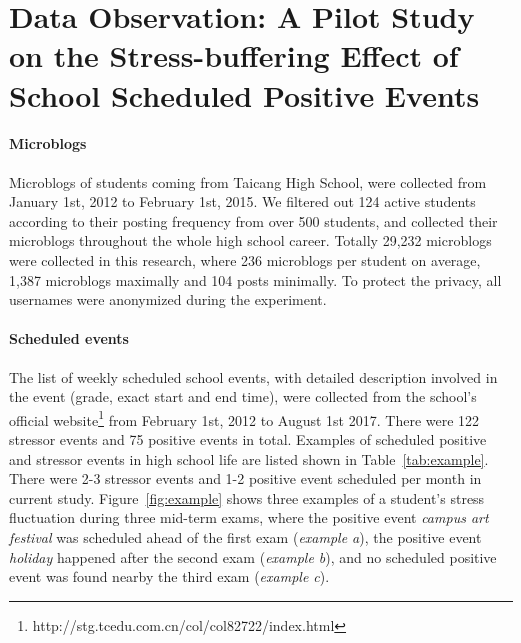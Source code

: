 \section{Data Observation: A Pilot Study on the Stress-buffering Effect of School Scheduled Positive Events}
\paragraph{Microblogs} Microblogs of students coming from Taicang High School,
were collected from January 1st, 2012 to February 1st, 2015. 
We filtered out 124 active students according to their posting frequency from over 500 students,
and collected their microblogs throughout the whole high school career.
Totally 29,232 microblogs were collected in this research,
where 236 microblogs per student on average, 1,387 microblogs maximally and 104 posts minimally.
To protect the privacy, all usernames were anonymized during the experiment. 

\paragraph{Scheduled events} The list of weekly scheduled school events, 
with detailed description involved in the event (grade, exact start and end time), 
were collected from the school's official website\footnote{http://stg.tcedu.com.cn/col/col82722/index.html} from February 1st, 2012 to August 1st 2017.
There were 122 stressor events and 75 positive events in total. 
Examples of scheduled positive and stressor events in high school life are listed shown in Table~\ref{tab:example}.
There were 2-3 stressor events and 1-2 positive event scheduled per month in current study.
Figure~\ref{fig:example} shows three examples of a student's stress fluctuation during three mid-term exams,
where the positive event \emph{campus art festival} was scheduled ahead of the first exam (\emph{example a}),
the positive event \emph{holiday} happened after the second exam (\emph{example b}),
and no scheduled positive event was found nearby the third exam (\emph{example c}).

\begin{table}[H]
\caption{\small{Examples of school scheduled positive and stressor events.}}
\label{tab:example}
\end{table}

